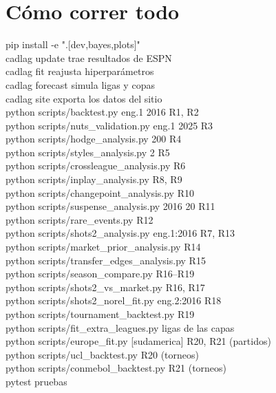 \section{Cómo correr todo}

\begin{comandos}
pip install -e ".[dev,bayes,plots]"\\
cadlag update \hfill\textrm{trae resultados de ESPN}\\
cadlag fit \hfill\textrm{reajusta hiperparámetros}\\
cadlag forecast \hfill\textrm{simula ligas y copas}\\
cadlag site \hfill\textrm{exporta los datos del sitio}\\[0.4em]
python scripts/backtest.py eng.1 2016 \hfill\textrm{R1, R2}\\
python scripts/nuts\_validation.py eng.1 2025 \hfill\textrm{R3}\\
python scripts/hodge\_analysis.py 200 \hfill\textrm{R4}\\
python scripts/styles\_analysis.py 2 \hfill\textrm{R5}\\
python scripts/crossleague\_analysis.py \hfill\textrm{R6}\\
python scripts/inplay\_analysis.py \hfill\textrm{R8, R9}\\
python scripts/changepoint\_analysis.py \hfill\textrm{R10}\\
python scripts/suspense\_analysis.py 2016 20 \hfill\textrm{R11}\\
python scripts/rare\_events.py \hfill\textrm{R12}\\
python scripts/shots2\_analysis.py eng.1:2016 \hfill\textrm{R7, R13}\\
python scripts/market\_prior\_analysis.py \hfill\textrm{R14}\\
python scripts/transfer\_edges\_analysis.py \hfill\textrm{R15}\\
python scripts/season\_compare.py \hfill\textrm{R16--R19}\\
python scripts/shots2\_vs\_market.py \hfill\textrm{R16, R17}\\
python scripts/shots2\_norel\_fit.py eng.2:2016 \hfill\textrm{R18}\\
python scripts/tournament\_backtest.py \hfill\textrm{R19}\\
python scripts/fit\_extra\_leagues.py \hfill\textrm{ligas de las capas}\\
python scripts/europe\_fit.py [sudamerica] \hfill\textrm{R20, R21 (partidos)}\\
python scripts/ucl\_backtest.py \hfill\textrm{R20 (torneos)}\\
python scripts/conmebol\_backtest.py \hfill\textrm{R21 (torneos)}\\
pytest \hfill\textrm{pruebas}
\end{comandos}

